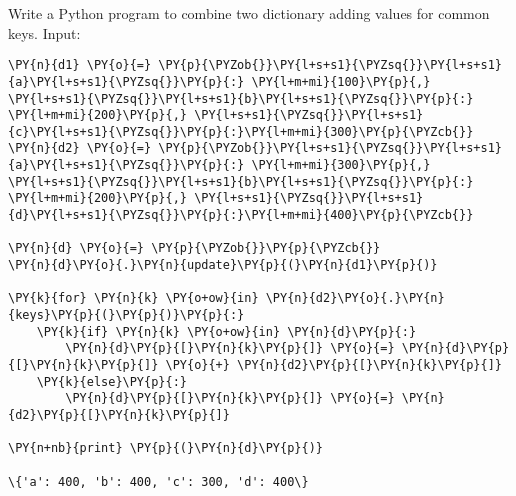 \begin{Exercise}
Write a Python program to combine two dictionary adding values for common keys.
Input:
\begin{Shaded}
\begin{Highlighting}[]
\OperatorTok{=}\NormalTok{ \{}\NormalTok{: }\NormalTok{, }\NormalTok{: }\NormalTok{, }\NormalTok{:}\NormalTok{\}}
\OperatorTok{=}\NormalTok{ \{}\NormalTok{: }\NormalTok{, }\NormalTok{: }\NormalTok{, }\NormalTok{:}\NormalTok{\}}
\end{Highlighting}
\end{Shaded}
\end{Exercise}

\begin{Answer}
\begin{tcolorbox}[size=fbox, boxrule=1pt, colback=cellbackground, colframe=cellborder]
\begin{Verbatim}[commandchars=\\\{\}]
\PY{n}{d1} \PY{o}{=} \PY{p}{\PYZob{}}\PY{l+s+s1}{\PYZsq{}}\PY{l+s+s1}{a}\PY{l+s+s1}{\PYZsq{}}\PY{p}{:} \PY{l+m+mi}{100}\PY{p}{,} \PY{l+s+s1}{\PYZsq{}}\PY{l+s+s1}{b}\PY{l+s+s1}{\PYZsq{}}\PY{p}{:} \PY{l+m+mi}{200}\PY{p}{,} \PY{l+s+s1}{\PYZsq{}}\PY{l+s+s1}{c}\PY{l+s+s1}{\PYZsq{}}\PY{p}{:}\PY{l+m+mi}{300}\PY{p}{\PYZcb{}}
\PY{n}{d2} \PY{o}{=} \PY{p}{\PYZob{}}\PY{l+s+s1}{\PYZsq{}}\PY{l+s+s1}{a}\PY{l+s+s1}{\PYZsq{}}\PY{p}{:} \PY{l+m+mi}{300}\PY{p}{,} \PY{l+s+s1}{\PYZsq{}}\PY{l+s+s1}{b}\PY{l+s+s1}{\PYZsq{}}\PY{p}{:} \PY{l+m+mi}{200}\PY{p}{,} \PY{l+s+s1}{\PYZsq{}}\PY{l+s+s1}{d}\PY{l+s+s1}{\PYZsq{}}\PY{p}{:}\PY{l+m+mi}{400}\PY{p}{\PYZcb{}}

\PY{n}{d} \PY{o}{=} \PY{p}{\PYZob{}}\PY{p}{\PYZcb{}}
\PY{n}{d}\PY{o}{.}\PY{n}{update}\PY{p}{(}\PY{n}{d1}\PY{p}{)}

\PY{k}{for} \PY{n}{k} \PY{o+ow}{in} \PY{n}{d2}\PY{o}{.}\PY{n}{keys}\PY{p}{(}\PY{p}{)}\PY{p}{:}
    \PY{k}{if} \PY{n}{k} \PY{o+ow}{in} \PY{n}{d}\PY{p}{:}
        \PY{n}{d}\PY{p}{[}\PY{n}{k}\PY{p}{]} \PY{o}{=} \PY{n}{d}\PY{p}{[}\PY{n}{k}\PY{p}{]} \PY{o}{+} \PY{n}{d2}\PY{p}{[}\PY{n}{k}\PY{p}{]}
    \PY{k}{else}\PY{p}{:}
        \PY{n}{d}\PY{p}{[}\PY{n}{k}\PY{p}{]} \PY{o}{=} \PY{n}{d2}\PY{p}{[}\PY{n}{k}\PY{p}{]}

\PY{n+nb}{print} \PY{p}{(}\PY{n}{d}\PY{p}{)}

\{'a': 400, 'b': 400, 'c': 300, 'd': 400\}
\end{Verbatim}
\end{tcolorbox}
\end{Answer}

